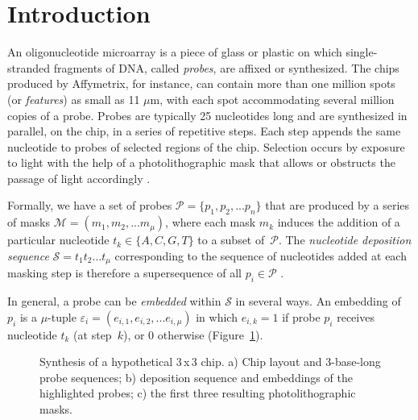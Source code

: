 \documentclass{bioinfo}
\begin{document}
\section{Introduction}

An oligonucleotide microarray is a piece of glass or plastic on which single-stranded fragments of DNA, called \emph{probes}, are affixed or synthesized. The chips produced by Affymetrix, for instance, can contain more than one million spots (or \emph{features}) as small as 11 $\mu$m, with each spot accommodating several million copies of a probe. Probes are typically 25 nucleotides long and are synthesized in parallel, on the chip, in a series of repetitive steps. Each step appends the same nucleotide to probes of selected regions of the chip. Selection occurs by exposure to light with the help of a photolithographic mask that allows or obstructs the passage of light accordingly \citep{FODOR91}.

Formally, we have a set of probes $\mathcal{P} = \{p_{1}, p_{2}, ... p_{n}\}$ that are produced by a series of masks $\mathcal{M} = (m_{1}, m_{2}, ... m_{\mu})$, where each mask $m_{k}$ induces the addition of a particular nucleotide $t_{k} \in \{A, C, G, T\}$ to a subset of~$\mathcal{P}$. The \emph{nucleotide deposition sequence} $\mathcal{S} = t_{1} t_{2} \ldots t_{\mu}$ corresponding to the sequence of nucleotides added at each masking step is therefore a supersequence of all $p_{i} \in \mathcal{P}$ \citep{RAHMANN03}.

In general, a probe can be \emph{embedded} within $\mathcal{S}$ in several ways. An embedding of $p_{i}$ is a $\mu$-tuple $\varepsilon_{i} = (e_{i,1}, e_{i,2}, ... e_{i,\mu})$ in which $e_{i,k} = 1$ if probe $p_{i}$ receives nucleotide $t_{k}$ (at step~$k$), or 0 otherwise (Figure~\ref{fig:masking_process}).

\begin{figure}
\caption{Synthesis of a hypothetical 3\,x\,3 chip. a) Chip layout and 3-base-long probe sequences; b) deposition sequence and embeddings of the highlighted probes; c) the first three resulting photolithographic masks.}
\label{fig:masking_process}
\end{figure}
\end{document}
